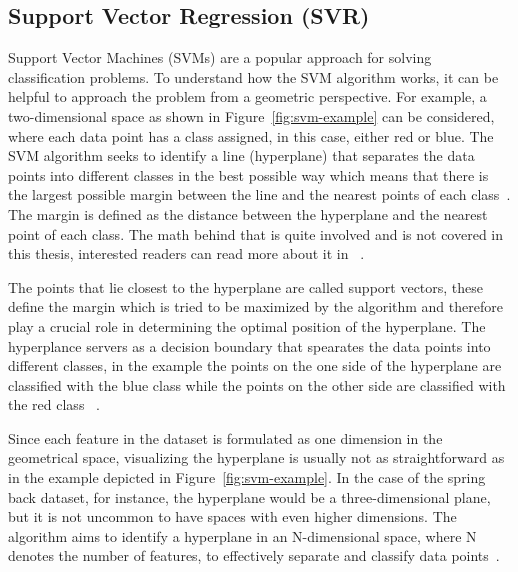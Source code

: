 \subsection{Support Vector Regression (SVR)}\label{subsec:support-vector-regression-(svr)}
Support Vector Machines (SVMs) are a popular approach for solving classification problems.
To understand how the SVM algorithm works, it can be helpful to approach the problem from a geometric perspective.
For example, a two-dimensional space as shown in Figure~\ref{fig:svm-example} can be considered, where each data point
has a class assigned, in this case, either red or blue.
The SVM algorithm seeks to identify a line (hyperplane) that separates the data points into different classes in the
best possible way which means that there is the largest possible margin between the line and the
nearest points of each class~\cite{muller_introductionmachinelearning_2016}.
The margin is defined as the distance between the hyperplane and the nearest point of each class.
The math behind that is quite involved and is not covered in this thesis, interested readers can read more about it
in ~\cite{hastie2009elements}.

The points that lie closest to the hyperplane are called support vectors, these define the margin which is tried to be
maximized by the algorithm and therefore play a crucial role in determining the optimal position of the hyperplane.
The hyperplance servers as a decision boundary that spearates the data points into different
classes, in the example the points on the one side of the hyperplane are classified with the blue class while the
points on
the other side are classified with the red class ~\cite[p. 42]{awad_efficientlearningmachines_2015}.

Since each feature in the dataset is formulated as one dimension in the geometrical space, visualizing the hyperplane
is usually not as straightforward as in the example depicted in Figure~\ref{fig:svm-example}. In the case of the
spring back dataset, for instance, the hyperplane would be a three-dimensional plane, but it is not uncommon to have
spaces with even higher dimensions.
The algorithm aims to identify a hyperplane in an N-dimensional space, where N denotes the number of features, to
effectively separate and classify data points~\cite[]{awad_efficientlearningmachines_2015}.

